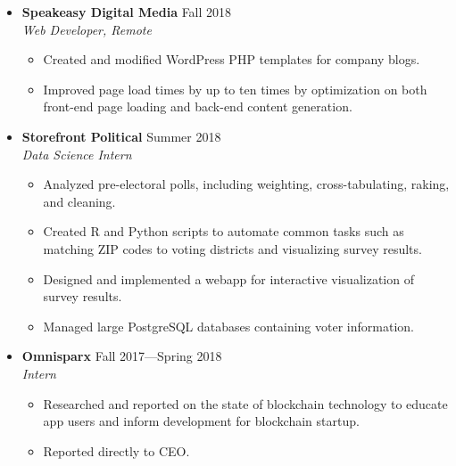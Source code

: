 \documentclass[12pt,letterpaper]{article}
\newenvironment{explist}
{\begin{itemize}[label=\textbf{--},itemsep=1pt,topsep=0pt,partopsep=0pt,parsep=0pt]}
{\end{itemize}}
\begin{document}
\begin{itemize}[label=]
    \item
        \textbf{Speakeasy Digital Media} \hfill Fall 2018\\
        \textit{Web Developer, Remote}
        \begin{explist}
        \item Created and modified WordPress PHP templates for company blogs.
        \item Improved page load times by up to ten times by optimization on both front-end page loading and back-end content generation.
        \end{explist}

    \item
        \textbf{Storefront Political} \hfill Summer 2018\\
        \textit{Data Science Intern}
        \begin{explist}
        \item Analyzed pre-electoral polls, including weighting, cross-tabulating, raking, and cleaning.
        \item Created R and Python scripts to automate common tasks such as matching ZIP codes to voting districts and visualizing survey results.
        \item Designed and implemented a webapp for interactive visualization of survey results.
        \item Managed large PostgreSQL databases containing voter information.
        \end{explist}

    \item
        \textbf{Omnisparx} \hfill Fall 2017---Spring 2018\\
        \textit{Intern}
        \begin{explist}
        \item Researched and reported on the state of blockchain technology to educate app users and inform development for blockchain startup.
        \item Reported directly to CEO.
        \end{explist}

\end{itemize}
\end{document}
